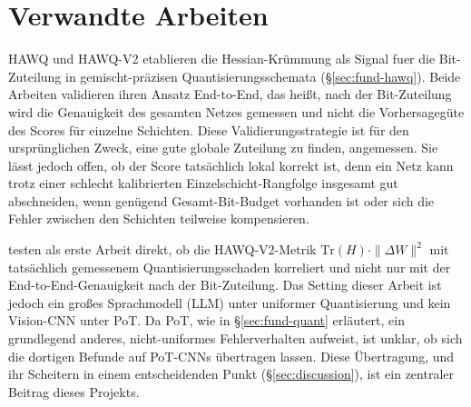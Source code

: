 \section{Verwandte Arbeiten}
\label{sec:related-work}

HAWQ \citep{dong_hawq_2019} und HAWQ-V2 \citep{dong_hawqv2_2020} etablieren die Hessian-Krümmung als Signal fuer die Bit-Zuteilung in gemischt-präzisen Quantisierungsschemata (\S\ref{sec:fund-hawq}). Beide Arbeiten validieren ihren Ansatz End-to-End, das heißt, nach der Bit-Zuteilung wird die Genauigkeit des gesamten Netzes gemessen und nicht die Vorhersagegüte des Scores für einzelne Schichten. Diese Validierungsstrategie ist für den ursprünglichen Zweck, eine gute globale Zuteilung zu finden, angemessen. Sie lässt jedoch offen, ob der Score tatsächlich lokal korrekt ist, denn ein Netz kann trotz einer schlecht kalibrierten Einzelschicht-Rangfolge insgesamt gut abschneiden, wenn genügend Gesamt-Bit-Budget vorhanden ist oder sich die Fehler zwischen den Schichten teilweise kompensieren.
\par\medskip

\citet{hill2026saturationmakesquantizationerror} testen als erste Arbeit direkt, ob die HAWQ-V2-Metrik $\mathrm{Tr}(H)\cdot\|\Delta W\|^2$ mit tatsächlich gemessenem Quantisierungsschaden korreliert und nicht nur mit der End-to-End-Genauigkeit nach der Bit-Zuteilung. Das Setting dieser Arbeit ist jedoch ein großes Sprachmodell (LLM) unter uniformer Quantisierung und kein Vision-CNN unter PoT. Da PoT, wie in \S\ref{sec:fund-quant} erläutert, ein grundlegend anderes, nicht-uniformes Fehlerverhalten aufweist, ist unklar, ob sich die dortigen Befunde auf PoT-CNNs übertragen lassen. Diese Übertragung, und ihr Scheitern in einem entscheidenden Punkt (\S\ref{sec:discussion}), ist ein zentraler Beitrag dieses Projekts.
\par\medskip

